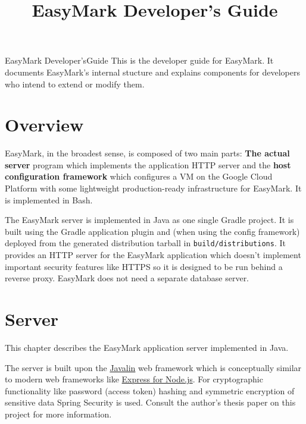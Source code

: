 \documentclass[12pt,a4paper]{report}
\title{EasyMark Developer's Guide}
\begin{document}
	\vspace*{.35\textheight}
	\fontsize{48pt}{48pt}
	\selectfont
	\tabto{230pt}
	E\hfill{}a\hfill{}s\hfill{}y\hfill{}M\hfill{}a\hfill{}r\hfill{}k
	\linebreak
	\vskip-35pt
	\fontsize{25pt}{25pt}
	\selectfont
	\tabto{232pt}
	D\hfill{}e\hfill{}v\hfill{}e\hfill{}l\hfill{}o\hfill{}p\hfill{}e\hfill{}r\hfill{}'\hfill{}s\space\space\hfill{}G\hfill{}u\hfill{}i\hfill{}d\hfill{}e
	\linebreak
	\normalsize
	\vfill
	\large
	This is the developer guide for EasyMark. It documents EasyMark's internal stucture and explains components for developers who intend to extend or modify them.
	\normalsize
	\pagebreak
	\tableofcontents
	\clearpage
	\chapter{Overview}
	EasyMark, in the broadest sense, is composed of two main parts: \textbf{The actual server} program which implements the application HTTP server and the \textbf{host configuration framework} which configures a VM on the Google Cloud Platform with some lightweight production-ready infrastructure for EasyMark. It is implemented in Bash.
	
	The EasyMark server is implemented in Java as one single Gradle project. It is built using the Gradle application plugin and (when using the config framework) deployed from the generated distribution tarball in \lstinline|build/distributions|. It provides an HTTP server for the EasyMark application which doesn't implement important security features like HTTPS so it is designed to be run behind a reverse proxy. EasyMark does not need a separate database server.
	
	\chapter{Server}
	This chapter describes the EasyMark application server implemented in Java.
	
	The server is built upon the \href{https://javalin.io/}{Javalin} web framework which is conceptually similar to modern web frameworks like \href{https://expressjs.com/}{Express for Node.js}. For cryptographic functionality like password (access token) hashing and symmetric encryption of sensitive data Spring Security is used. Consult the author's thesis paper on this project for more information.
	
\end{document}
